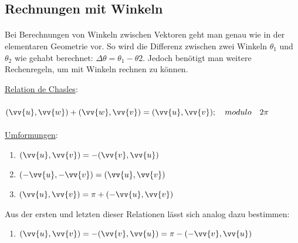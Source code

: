     \subsection{Rechnungen mit Winkeln}

        \paragraph{} Bei Berechnungen von Winkeln zwischen Vektoren geht man genau wie in der elementaren Geometrie vor.
         So wird die Differenz zwischen zwei Winkeln $\theta_{1}$ und $\theta_{2}$ wie gehabt berechnet: $\Delta\theta = \theta_{1} - \theta{2}$.
         Jedoch benötigt man weitere Rechenregeln, um mit Winkeln rechnen zu können.
        \\
        \begin{Theorem}
            \underline{Relation de Chasles}: \\\\
            $(\vv{u},\vv{w})+(\vv{w},\vv{v})=(\vv{u},\vv{v});\quad modulo\quad 2\pi$ \\\\
            \underline{Umformungen}: \\
            \begin{enumerate}[(1)]
                \item $(\vv{u},\vv{v})=-(\vv{v},\vv{u})\quad$
                \item $(-\vv{u},-\vv{v})=(\vv{u},\vv{v})\quad$
                \item $(\vv{u},\vv{v})=\pi+(-\vv{u},\vv{v})\quad$
            \end{enumerate}
                Aus der ersten und letzten dieser Relationen lässt sich analog dazu bestimmen:
            \begin{enumerate}[(4)]
                \item $(\vv{u},\vv{v})=-(\vv{v},\vv{u})=\pi-(-\vv{v},\vv{u})\quad$
            \end{enumerate}
        \end{Theorem}

        \\
        \\
        \\

